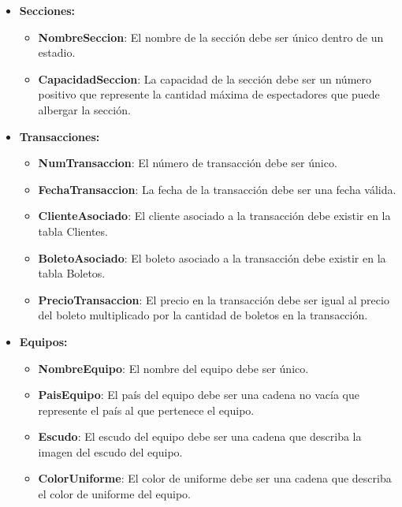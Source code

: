 \begin{itemize}
    \item \textbf{Secciones:}
    \begin{itemize}
        \item \textbf{NombreSeccion}: El nombre de la sección debe ser único dentro de un estadio.
        \item \textbf{CapacidadSeccion}: La capacidad de la sección debe ser un número positivo que represente la cantidad máxima de espectadores que puede albergar la sección.
    \end{itemize}

    \item \textbf{Transacciones:}
    \begin{itemize}
        \item \textbf{NumTransaccion}: El número de transacción debe ser único.
        \item \textbf{FechaTransaccion}: La fecha de la transacción debe ser una fecha válida.
        \item \textbf{ClienteAsociado}: El cliente asociado a la transacción debe existir en la tabla Clientes.
        \item \textbf{BoletoAsociado}: El boleto asociado a la transacción debe existir en la tabla Boletos.
        \item \textbf{PrecioTransaccion}: El precio en la transacción debe ser igual al precio del boleto multiplicado por la cantidad de boletos en la transacción.
    \end{itemize}

    \item \textbf{Equipos:}
    \begin{itemize}
        \item \textbf{NombreEquipo}: El nombre del equipo debe ser único.
        \item \textbf{PaisEquipo}: El país del equipo debe ser una cadena no vacía que represente el país al que pertenece el equipo.
        \item \textbf{Escudo}: El escudo del equipo debe ser una cadena que describa la imagen del escudo del equipo.
        \item \textbf{ColorUniforme}: El color de uniforme debe ser una cadena que describa el color de uniforme del equipo.
    \end{itemize}


\end{itemize}
